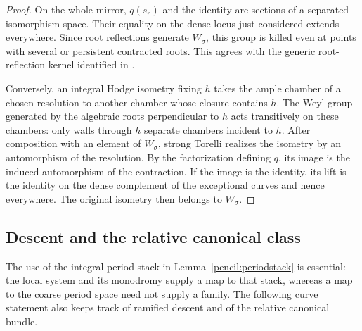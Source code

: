 \documentclass[11pt]{amsart}
\theoremstyle{definition}
\theoremstyle{remark}
\numberwithin{equation}{section}
\begin{document}
\begin{proof}
On the whole mirror, \(q(s_r)\) and the identity are sections of a
separated isomorphism space.  Their equality on the dense locus just
considered extends everywhere.  Since root reflections generate
\(W_\sigma\), this group is killed even at points with several or
persistent contracted roots.  This agrees with the generic
root-reflection kernel identified in
\cite[Lemma~3.6]{DiLorenzoFringuelliVistoli}.

Conversely, an integral Hodge isometry fixing \(h\) takes the ample
chamber of a chosen resolution to another chamber whose closure
contains \(h\).  The Weyl group generated by the algebraic roots
perpendicular to \(h\) acts transitively on these chambers: only walls
through \(h\) separate chambers incident to \(h\).  After composition
with an element of \(W_\sigma\), strong Torelli realizes the isometry
by an automorphism of the resolution.  By the factorization defining
\(q\), its image is the induced automorphism of the contraction.
If the image is the identity, its lift is the identity on the dense
complement of the exceptional curves and hence everywhere.  The
original isometry then belongs to \(W_\sigma\).
\end{proof}

\subsection{Descent and the relative canonical class}

The use of the integral period stack in Lemma~\ref{pencil:periodstack}
is essential: the local system and its monodromy supply a map to that
stack, whereas a map to the coarse period space need not supply a
family.  The following curve statement also keeps track of ramified
descent and of the relative canonical bundle.
\end{document}
